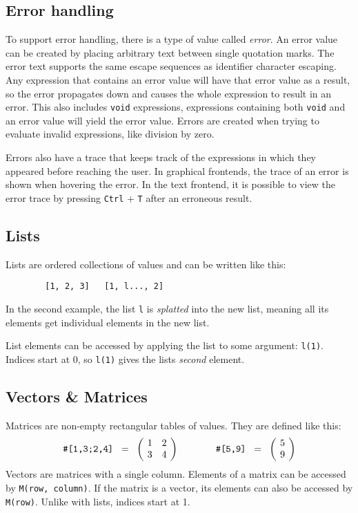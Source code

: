 \documentclass[10pt]{article}
\begin{document}
    \subsection{Error handling}\label{subsec:error-handling}
    To support error handling, there is a type of value called \textsl{error}.
    An error value can be created by placing arbitrary text between single quotation marks.
    The error text supports the same escape sequences as identifier character escaping.
    Any expression that contains an error value will have that error value as a result, so the error propagates down and causes the whole expression to result in an error.
    This also includes \verb|void| expressions, expressions containing both \verb|void| and an error value will yield the error value.
    Errors are created when trying to evaluate invalid expressions, like division by zero.
    
    Errors also have a trace that keeps track of the expressions in which they appeared before reaching the user.
    In graphical frontends, the trace of an error is shown when hovering the error.
    In the text frontend, it is possible to view the error trace by pressing \verb|Ctrl| + \verb|T| after an erroneous result.
    
    \subsection{Lists}\label{subsec:lists}
    Lists are ordered collections of values and can be written like this:
    \begin{verbatim}
        [1, 2, 3]   [1, l..., 2]
    \end{verbatim}
    In the second example, the list \verb|l| is \textsl{splatted} into the new list, meaning all its elements get individual elements in the new list.
    
    List elements can be accessed by applying the list to some argument: \verb|l(1)|.
    Indices start at $ 0 $, so \verb|l(1)| gives the lists \textsl{second} element.
    
    \subsection{Vectors \& Matrices}\label{subsec:vectors-matrices}
    Matrices are non-empty rectangular tables of values.
    They are defined like this:
    \[
        \verb|#[1,3;2,4]| \;\; = \;\; \biggl(\kern-\nulldelimiterspace\begin{array}{cc}
            1 & 2 \\
            3 & 4 \\
        \end{array}\kern-\nulldelimiterspace\biggr)
        \qquad\qquad
        \verb|#[5,9]| \;\; = \;\; \biggl(\kern-\nulldelimiterspace\begin{array}{c}
            5 \\ 9
        \end{array}\kern-\nulldelimiterspace\biggr)
    \]
    Vectors are matrices with a single column.
    Elements of a matrix can be accessed by \verb|M(row, column)|.
    If the matrix is a vector, its elements can also be accessed by \verb|M(row)|.
    Unlike with lists, indices start at 1.
\end{document}
